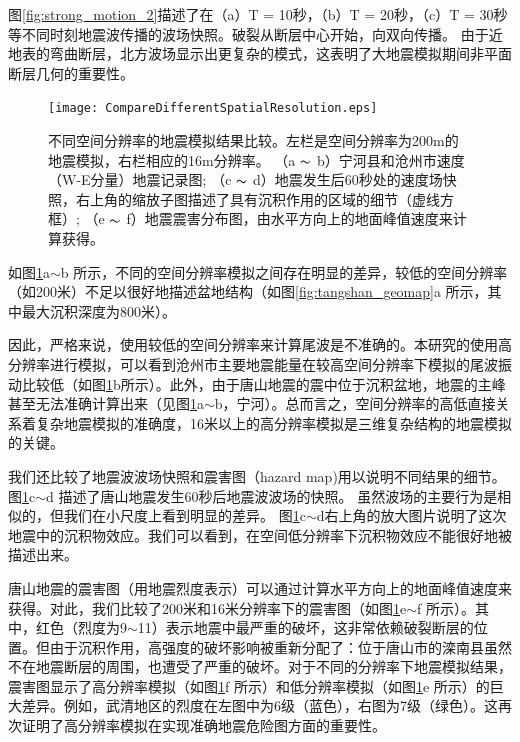 \documentclass[degree=doctor]{thuthesis}
\begin{document}
图\ref{fig:strong_motion_2}描述了在（a）T = 10秒，（b）T = 20秒，（c）T = 30秒等不同时刻地震波传播的波场快照。破裂从断层中心开始，向双向传播。 由于近地表的弯曲断层，北方波场显示出更复杂的模式，这表明了大地震模拟期间非平面断层几何的重要性。

\begin{figure}[t]
  \centering
  \texttt{[image: CompareDifferentSpatialResolution.eps]}\\
  \caption{
不同空间分辨率的地震模拟结果比较。左栏是空间分辨率为200m的地震模拟，右栏相应的16m分辨率。 （a $ \thicksim $ b）宁河县和沧州市速度（W-E分量）地震记录图; （c $ \thicksim $ d）地震发生后60秒处的速度场快照，右上角的缩放子图描述了具有沉积作用的区域的细节（虚线方框）; （e $ \thicksim $ f）地震震害分布图，由水平方向上的地面峰值速度来计算获得。}
  \label{fig:strong_motion}
\end{figure}

如图\ref{fig:strong_motion}a$\sim$b 所示，不同的空间分辨率模拟之间存在明显的差异，较低的空间分辨率（如200米）不足以很好地描述盆地结构（如图\ref{fig:tangshan_geomap}a 所示，其中最大沉积深度为800米）。


因此，严格来说，使用较低的空间分辨率来计算尾波是不准确的。本研究的使用高分辨率进行模拟，可以看到沧州市主要地震能量在较高空间分辨率下模拟的尾波振动比较低（如图\ref{fig:strong_motion}b所示）。此外，由于唐山地震的震中位于沉积盆地，地震的主峰甚至无法准确计算出来（见图\ref{fig:strong_motion}a$\sim$b，宁河）。总而言之，空间分辨率的高低直接关系着复杂地震模拟的准确度，16米以上的高分辨率模拟是三维复杂结构的地震模拟的关键。

我们还比较了地震波波场快照和震害图（hazard map)用以说明不同结果的细节。 图\ref{fig:strong_motion}c$\sim$d 描述了唐山地震发生60秒后地震波波场的快照。 虽然波场的主要行为是相似的，但我们在小尺度上看到明显的差异。 图\ref{fig:strong_motion}c$\sim$d右上角的放大图片说明了这次地震中的沉积物效应。我们可以看到，在空间低分辨率下沉积物效应不能很好地被描述出来。

唐山地震的震害图（用地震烈度表示）可以通过计算水平方向上的地面峰值速度来获得。对此，我们比较了200米和16米分辨率下的震害图（如图\ref{fig:strong_motion}e$\sim$f 所示）。其中，红色（烈度为9$\sim$11）表示地震中最严重的破坏，这非常依赖破裂断层的位置。但由于沉积作用，高强度的破坏影响被重新分配了：位于唐山市的滦南县虽然不在地震断层的周围，也遭受了严重的破坏。对于不同的分辨率下地震模拟结果，震害图显示了高分辨率模拟（如图\ref{fig:strong_motion}f 所示）和低分辨率模拟（如图\ref{fig:strong_motion}e 所示）的巨大差异。例如，武清地区的烈度在左图中为6级（蓝色），右图为7级（绿色）。这再次证明了高分辨率模拟在实现准确地震危险图方面的重要性。
\end{document}
